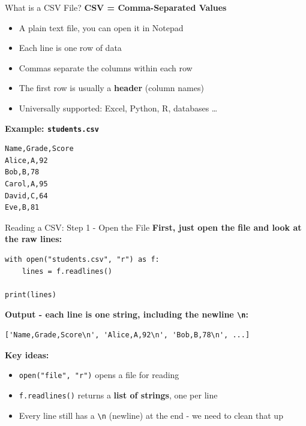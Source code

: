 \documentclass{csbeamer}
\begin{document}
\begin{frame}[fragile]{What is a CSV File?}
    \textbf{CSV = Comma-Separated Values}

    \vspace{0.5em}

    \begin{itemize}
        \item A plain text file, you can open it in Notepad
        \item Each \textcolor{stfxblue}{line} is one row of data
        \item \textcolor{marigold}{Commas} separate the columns within each row
        \item The \textcolor{stfxblue}{first row} is usually a \textbf{header} (column names)
        \item Universally supported: Excel, Python, R, databases \ldots
    \end{itemize}

    \vspace{0.5em}

    \textbf{Example: \texttt{students.csv}}
    \begin{lstlisting}[language={},frame=single,numbers=none]
Name,Grade,Score
Alice,A,92
Bob,B,78
Carol,A,95
David,C,64
Eve,B,81
    \end{lstlisting}
\end{frame}

\begin{frame}[fragile]{Reading a CSV: Step 1 - Open the File}
    \textbf{First, just open the file and look at the raw lines:}

    \begin{lstlisting}
with open("students.csv", "r") as f:
    lines = f.readlines()

print(lines)
    \end{lstlisting}

    \vspace{0.8em}
    \pause

    \textbf{Output - each line is one string, including the newline \texttt{\textbackslash n}:}

    \begin{lstlisting}
['Name,Grade,Score\n', 'Alice,A,92\n', 'Bob,B,78\n', ...]
    \end{lstlisting}

    \vspace{0.8em}
    \pause

    \textbf{Key ideas:}
    \begin{itemize}
        \item<3-> \texttt{open("file", "r")} opens a file for \textcolor{stfxblue}{reading}
        \item<4-> \texttt{f.readlines()} returns a \textcolor{marigold}{\textbf{list of strings}}, one per line
        \item<5-> Every line still has a \texttt{\textbackslash n} (newline) at the end - we need to clean that up
    \end{itemize}
\end{frame}
\end{document}
